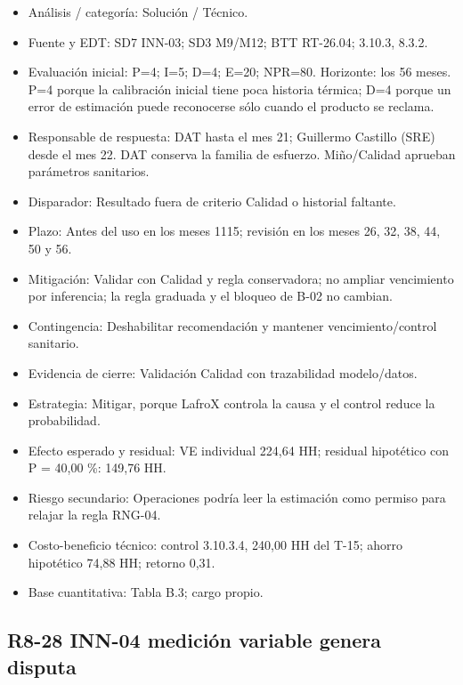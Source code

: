 \begin{itemize}[leftmargin=*,itemsep=3pt]
\item Análisis / categoría: Solución / Técnico.
\item Fuente y EDT: SD7 INN-03; SD3 M9/M12; BTT RT-26.04; 3.10.3, 8.3.2.
\item Evaluación inicial: P=4; I=5; D=4; E=20; NPR=80. Horizonte: los 56 meses. P=4 porque la calibración inicial tiene poca historia térmica; D=4 porque un error de estimación puede reconocerse sólo cuando el producto se reclama.
\item Responsable de respuesta: DAT hasta el mes 21; Guillermo Castillo (SRE) desde el mes 22. DAT conserva la familia de esfuerzo. Miño/Calidad aprueban parámetros sanitarios.
\item Disparador: Resultado fuera de criterio Calidad o historial faltante.
\item Plazo: Antes del uso en los meses 11\textendash{}15; revisión en los meses 26, 32, 38, 44, 50 y 56.
\item Mitigación: Validar con Calidad y regla conservadora; no ampliar vencimiento por inferencia; la regla graduada y el bloqueo de B-02 no cambian.
\item Contingencia: Deshabilitar recomendación y mantener vencimiento/control sanitario.
\item Evidencia de cierre: Validación Calidad con trazabilidad modelo/datos.
\item Estrategia: Mitigar, porque LafroX controla la causa y el control reduce la probabilidad.
\item Efecto esperado y residual: VE individual 224,64 HH; residual hipotético con P = 40,00 \%: 149,76 HH.
\item Riesgo secundario: Operaciones podría leer la estimación como permiso para relajar la regla RNG-04.
\item Costo-beneficio técnico: control 3.10.3.4, 240,00 HH del T-15; ahorro hipotético 74,88 HH; retorno 0,31.
\item Base cuantitativa: Tabla B.3; cargo propio.
\end{itemize}

\subsection*{R8-28 \textemdash{} INN-04 medición variable genera disputa}

